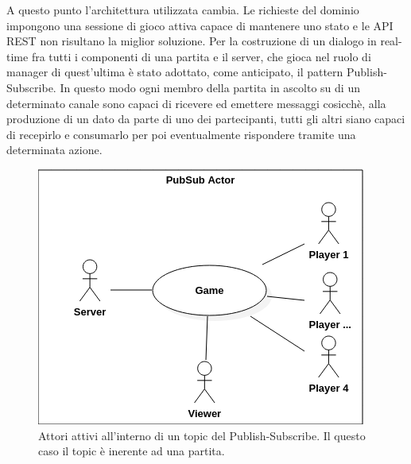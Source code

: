             A questo punto l'architettura utilizzata cambia. Le richieste del dominio impongono una sessione di gioco attiva capace di mantenere uno stato e le API REST non risultano la miglior soluzione. 
            Per la costruzione di un dialogo in real-time fra tutti i componenti di una partita e il server, che gioca nel ruolo di manager di quest'ultima è stato adottato, come anticipato, il pattern Publish-Subscribe. 
            In questo modo ogni membro della partita in ascolto su di un determinato canale sono capaci di ricevere ed emettere messaggi cosicchè, alla produzione di un dato da parte di uno dei partecipanti, tutti gli altri siano capaci di recepirlo e consumarlo per poi eventualmente rispondere tramite una determinata azione.
            
            \begin{figure}[h!]
                \includegraphics[scale=0.6]{image/PubSubActorDiagram.png}
                \caption{Attori attivi all'interno di un topic del Publish-Subscribe. Il questo caso il topic è inerente ad una partita.}
            \end{figure}
            
